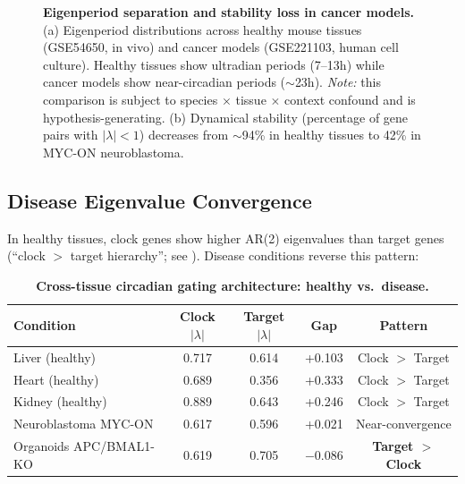 \documentclass[11pt,letterpaper]{article}
\begin{document}
\begin{figure}[H]
\centering
{}
\caption{\textbf{Eigenperiod separation and stability loss in cancer models.} (a) Eigenperiod distributions across healthy mouse tissues (GSE54650, in vivo) and cancer models (GSE221103, human cell culture). Healthy tissues show ultradian periods (7--13h) while cancer models show near-circadian periods ($\sim$23h). \textit{Note:} this comparison is subject to species $\times$ tissue $\times$ context confound and is hypothesis-generating. (b) Dynamical stability (percentage of gene pairs with $|\lambda| < 1$) decreases from $\sim$94\% in healthy tissues to 42\% in MYC-ON neuroblastoma.}
\label{fig:eigenperiod}
\end{figure}

\subsection{Disease Eigenvalue Convergence}

In healthy tissues, clock genes show higher AR(2) eigenvalues than target genes (``clock $>$ target hierarchy''; see \citealt{whiteside2026paper1}). Disease conditions reverse this pattern:

\begin{table}[H]
\centering
\caption{\textbf{Cross-tissue circadian gating architecture: healthy vs.\ disease.}}
\begin{tabular}{lcccc}
\toprule
Condition & Clock $|\lambda|$ & Target $|\lambda|$ & Gap & Pattern \\
\midrule
Liver (healthy) & 0.717 & 0.614 & +0.103 & Clock $>$ Target \\
Heart (healthy) & 0.689 & 0.356 & +0.333 & Clock $>$ Target \\
Kidney (healthy) & 0.889 & 0.643 & +0.246 & Clock $>$ Target \\
Neuroblastoma MYC-ON & 0.617 & 0.596 & +0.021 & Near-convergence \\
Organoids APC/BMAL1-KO & 0.619 & 0.705 & $-$0.086 & \textbf{Target $>$ Clock} \\
\bottomrule
\end{tabular}
\end{table}
\end{document}
